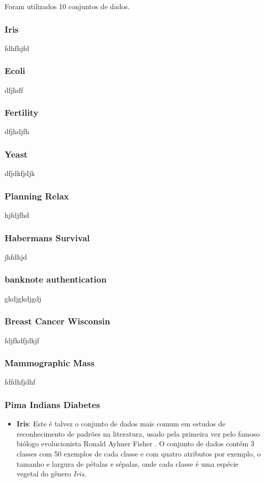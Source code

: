 \documentclass[12pt, a4paper, brazil]{article}
\begin{document}
Foram utilizados 10 conjuntos de dados.

\subsubsection{Iris}
fdhfhjfd
\subsubsection{Ecoli}
dfjhdf
\subsubsection{Fertility}
dfjhdjfh
\subsubsection{Yeast}
dfjdkfjdjk
\subsubsection{Planning Relax}
hjfdjfhd
\subsubsection{Habermans Survival}
jhfdhjd
\subsubsection{banknote authentication}
gkdjgkdjgdj
\subsubsection{Breast Cancer Wisconsin}
fdjfkdfjdkjf
\subsubsection{Mammographic Mass}
fdfdhfjdhf
\subsubsection{Pima Indians Diabetes}

\begin{itemize}

\item \textbf{Iris}: Este é talvez o conjunto de dados mais comum em estudos de reconhecimento de padrões na literatura, usado pela primeira vez pelo famoso biólogo evolucionista Ronald Aylmer Fisher \citep{Fisher1936}. O conjunto de dados contém 3 classes com 50 exemplos de cada classe e com quatro atributos por exemplo, o tamanho e largura de pétalas e sépalas, onde cada classe é uma espécie vegetal do gênero \emph{Iris}.

\end{itemize}
\end{document}

